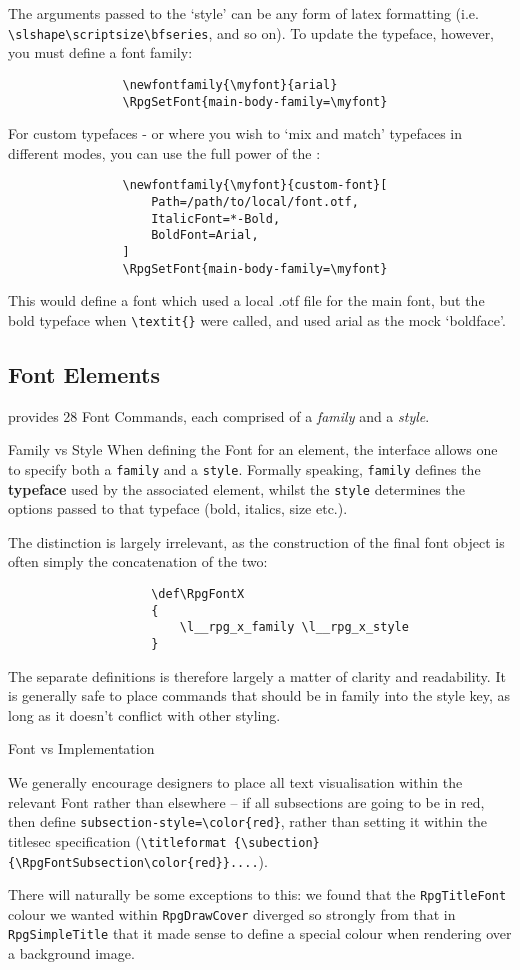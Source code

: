 			The arguments passed to the `style' can be any form of latex formatting (i.e. \verb|\slshape\scriptsize\bfseries|, and so on). To update the typeface, however, you must define a font family:
			\begin{lstlisting}
				\newfontfamily{\myfont}{arial}
				\RpgSetFont{main-body-family=\myfont}
			\end{lstlisting}

			For custom typefaces - or where you wish to `mix and match' typefaces in different modes, you can use the full power of the :
			\begin{lstlisting}
				\newfontfamily{\myfont}{custom-font}[
					Path=/path/to/local/font.otf,
					ItalicFont=*-Bold,
					BoldFont=Arial,
				]
				\RpgSetFont{main-body-family=\myfont}
			\end{lstlisting}
			This would define a font which used a local .otf file for the main font, but the bold typeface when \verb|\textit{}| were called, and used arial as the mock `boldface'.

		\subsection{Font Elements}
			\rpgtex{} provides 28 Font Commands, each comprised of a \textit{family} and a \textit{style}. 
			\begin{RpgSidebar}{Family vs Style}
				When defining the Font for an element, the interface allows one to specify both a \texttt{family} and a \texttt{style}. Formally speaking, \texttt{family} defines the \textbf{typeface} used by the associated element, whilst the \texttt{style} determines the options passed to that typeface (bold, italics, size etc.).

				The distinction is largely irrelevant, as the construction of the final font object is often simply the concatenation of the two:
				\begin{lstlisting}
					\def\RpgFontX
					{
						\l__rpg_x_family \l__rpg_x_style
					}
				\end{lstlisting}
				The separate definitions is therefore largely a matter of clarity and readability. It is generally safe to place commands that should be in family into the style key, as long as it doesn't conflict with other styling.
				
				\vspace{1em}
				{\RpgFontSidebarTitle{} \noindent{} Font vs Implementation}

				We generally encourage designers to place all text visualisation within the relevant Font rather than elsewhere -- if all subsections are going to be in red, then define \verb|subsection-style=\color{red}|, rather than setting it within the titlesec specification (\verb|\titleformat {\subection}{\RpgFontSubsection\color{red}}....|).

				There will naturally be some exceptions to this: we found that the \verb|RpgTitleFont| colour we wanted within \verb|RpgDrawCover| diverged so strongly from that in \verb|RpgSimpleTitle| that it made sense to define a special colour when rendering over a background image.
			\end{RpgSidebar}

